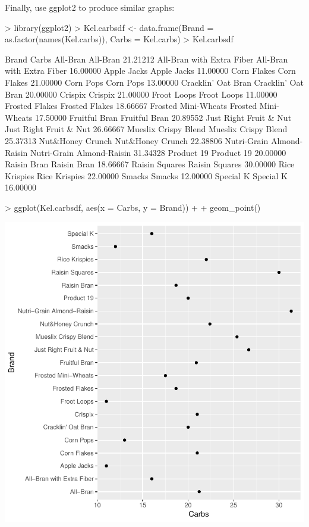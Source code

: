 \documentclass[12pt,letterpaper,final]{article}
\begin{document}
Finally, use ggplot2 to produce similar graphs:

\begin{Schunk}
\begin{Sinput}
> library(ggplot2)
> Kel.carbsdf <- data.frame(Brand = as.factor(names(Kel.carbs)), Carbs = Kel.carbs)
> Kel.carbsdf 
\end{Sinput}
\begin{Soutput}
                                              Brand    Carbs
All-Bran                                   All-Bran 21.21212
All-Bran with Extra Fiber All-Bran with Extra Fiber 16.00000
Apple Jacks                             Apple Jacks 11.00000
Corn Flakes                             Corn Flakes 21.00000
Corn Pops                                 Corn Pops 13.00000
Cracklin' Oat Bran               Cracklin' Oat Bran 20.00000
Crispix                                     Crispix 21.00000
Froot Loops                             Froot Loops 11.00000
Frosted Flakes                       Frosted Flakes 18.66667
Frosted Mini-Wheats             Frosted Mini-Wheats 17.50000
Fruitful Bran                         Fruitful Bran 20.89552
Just Right Fruit & Nut       Just Right Fruit & Nut 26.66667
Mueslix Crispy Blend           Mueslix Crispy Blend 25.37313
Nut&Honey Crunch                   Nut&Honey Crunch 22.38806
Nutri-Grain Almond-Raisin Nutri-Grain Almond-Raisin 31.34328
Product 19                               Product 19 20.00000
Raisin Bran                             Raisin Bran 18.66667
Raisin Squares                       Raisin Squares 30.00000
Rice Krispies                         Rice Krispies 22.00000
Smacks                                       Smacks 12.00000
Special K                                 Special K 16.00000
\end{Soutput}
\begin{Sinput}
> ggplot(Kel.carbsdf, aes(x = Carbs, y = Brand)) +
+   geom_point()
\end{Sinput}
\end{Schunk}
\includegraphics{lect_main-022}
\end{document}
